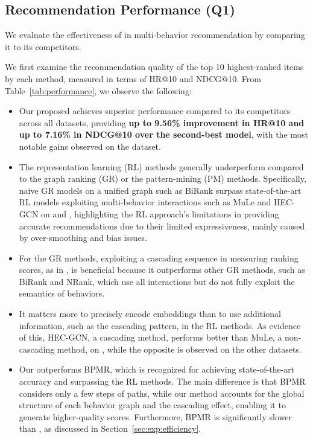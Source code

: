 \subsection{Recommendation Performance (Q1)} 
We evaluate the effectiveness of \method in multi-behavior recommendation by comparing it to its competitors.

We first examine the recommendation quality of the top 10 highest-ranked items by each method, measured in terms of HR@10 and NDCG@10.
From Table~\ref{tab:performance}, we observe the following:
\begin{itemize}[leftmargin=9mm,noitemsep]
    \item{
        Our proposed \method achieves superior performance compared to its competitors across all datasets, providing \textbf{up to 9.56\% improvement in HR@10 and up to 7.16\% in NDCG@10 over the second-best model}, with the most notable gains observed on the \taobao dataset.
    }
    \item{
        The representation learning (RL) methods generally underperform compared to the graph ranking (GR) or the pattern-mining (PM) methods.
        Specifically, naive GR models on a unified graph such as BiRank surpass state-of-the-art RL models exploiting multi-behavior interactions such as MuLe and HEC-GCN on \taobao and \tmall, highlighting the RL approach’s limitations in providing accurate recommendations due to their limited expressiveness, mainly caused by over-smoothing and bias issues.
    }
    \item{
        For the GR methods, exploiting a cascading sequence in measuring ranking scores, as in \method, is beneficial because it outperforms other GR methods, such as BiRank and NRank, which use all interactions but do not fully exploit the semantics of behaviors.
    }
    \item{
        It matters more to precisely encode embeddings than to use additional information, such as the cascading pattern, in the RL methods. 
        As evidence of this, HEC-GCN, a cascading method, performs better than MuLe, a non-cascading method, on \tenrec, while the opposite is observed on the other datasets.
    }
    \item {
        Our \method outperforms BPMR, which is recognized for achieving state-of-the-art accuracy and surpassing the RL methods. 
        The main difference is that BPMR considers only a few steps of paths, while our method accounts for the global structure of each behavior graph and the cascading effect, enabling it to generate higher-quality scores.      Furthermore, BPMR is significantly slower than \method, as discussed in Section~\ref{sec:exp:efficiency}.
    }
\end{itemize}

